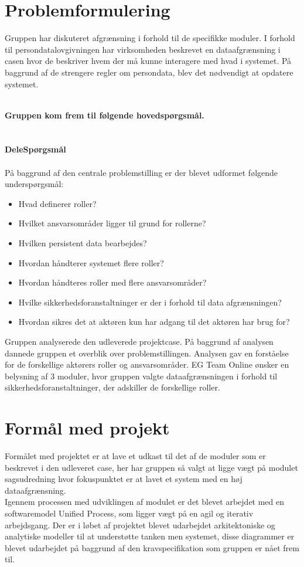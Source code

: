 \section{Problemformulering}

Gruppen har diskuteret afgrænsning i forhold til de specifikke moduler. I forhold til persondatalovgivningen har virksomheden beskrevet en dataafgrænsning i casen hvor de beskriver hvem der må kunne interagere med hvad i systemet. På baggrund af de strengere regler om persondata, blev det nødvendigt at opdatere systemet.

\textbf{\\Gruppen kom frem til følgende hovedspørgsmål.}\\ \\
\noindent{}
 \textbf{\\DeleSpørgsmål\\}\\
På baggrund af den centrale problemstilling er der blevet udformet følgende underspørgsmål:\\ 
\begin{itemize}
\item Hvad definerer roller?
\item Hvilket ansvarsområder ligger til grund for rollerne?
\item Hvilken persistent data bearbejdes?
\item Hvordan håndterer systemet flere roller?
\item Hvordan håndteres roller med flere ansvarsområder?
\item Hvilke sikkerhedsforanstaltninger er der i forhold til data afgrænsningen?
\item Hvordan sikres det at aktøren kun har adgang til det aktøren har brug for? 
\end{itemize}
Gruppen analyserede den udleverede projektcase. På baggrund af analysen dannede gruppen et overblik over problemstillingen. Analysen gav en forståelse for de forskellige aktørers roller og ansvarsområder. EG Team Online ønsker en belysning af 3 moduler, hvor gruppen valgte dataafgrænsningen i forhold til sikkerhedsforanstaltninger, der adskiller de forskellige roller.
\section{Formål med projekt}
Formålet med projektet er at lave et udkast til det af de moduler som er beskrevet i den udleveret case, her har gruppen så valgt at ligge vægt på modulet sagsudredning hvor fokuspunktet er at lavet et system med en høj dataafgrænsning.\\
Igennem processen med udviklingen af modulet er det blevet arbejdet med en softwaremodel Unified Process, som ligger vægt på en agil og iterativ arbejdsgang. Der er i løbet af projektet blevet udarbejdet arkitektoniske og analytiske modeller til at understøtte tanken men systemet, disse diagrammer er blevet udarbejdet på baggrund af den kravspecifikation som gruppen er nået frem til. 

